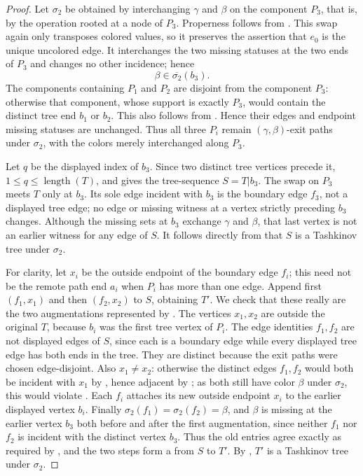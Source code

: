 \begin{proof}
Let $\sigma_2$ be obtained by interchanging $\gamma$ and $\beta$ on the
component $P_3$, that is, by the operation
 rooted at a node of $P_3$.
Properness follows from .  This swap
again only transposes colored values, so it preserves the assertion that
$e_0$ is the unique uncolored edge.  It interchanges the two missing
statuses at the two ends of $P_3$ and changes no other incidence; hence
\[
 \beta\in\overline{\sigma_2}(b_3).
\]
The components containing $P_1$ and $P_2$ are disjoint from the component
$P_3$: otherwise that component, whose support is exactly $P_3$, would
contain the distinct tree end $b_1$ or $b_2$.  This also follows from
.  Hence their edges and endpoint
missing statuses are unchanged.  Thus all three $P_i$ remain
$(\gamma,\beta)$-exit paths under $\sigma_2$, with the colors merely
interchanged along $P_3$.

Let $q$ be the displayed index of $b_3$.  Since two distinct tree vertices
precede it, $1\le q\le\operatorname{length}(T)$, and
 gives the tree-sequence
$S=T|b_3$.  The swap on $P_3$ meets $T$ only at $b_3$.  Its sole edge
incident with $b_3$ is the boundary edge $f_3$, not a displayed tree edge;
no edge or missing witness at a vertex strictly preceding $b_3$ changes.
Although the missing sets at $b_3$ exchange $\gamma$ and $\beta$, that last
vertex is not an earlier witness for any edge of $S$.  It follows directly
from  that $S$ is a Tashkinov tree under $\sigma_2$.

For clarity, let $x_i$ be the outside endpoint of the boundary edge $f_i$;
this need not be the remote path end $a_i$ when $P_i$ has more than one
edge.  Append first $(f_1,x_1)$ and then $(f_2,x_2)$ to $S$, obtaining
$T'$.  We check that these really are the two augmentations represented by
.  The vertices $x_1,x_2$ are outside the
original $T$, because $b_i$ was the first tree vertex of $P_i$.  The edge
identities $f_1,f_2$ are not displayed edges of $S$, since each is a
boundary edge while every displayed tree edge has both ends in the tree.
They are distinct because the exit paths were chosen edge-disjoint.  Also
$x_1\ne x_2$: otherwise the distinct edges $f_1,f_2$ would both be
incident with $x_1$ by , hence adjacent by
; as both still have color $\beta$ under $\sigma_2$,
this would violate .  Each $f_i$
attaches its new outside endpoint $x_i$ to the earlier displayed vertex
$b_i$.  Finally $\sigma_2(f_1)=\sigma_2(f_2)=\beta$, and $\beta$ is
missing at the earlier vertex $b_3$ both before and after the first
augmentation, since neither $f_1$ nor $f_2$ is incident with the distinct
vertex $b_3$.  Thus the old entries agree exactly as required by
, and the two steps form a
 from $S$ to $T'$.
By , $T'$ is a
Tashkinov tree under $\sigma_2$.


\end{proof}
